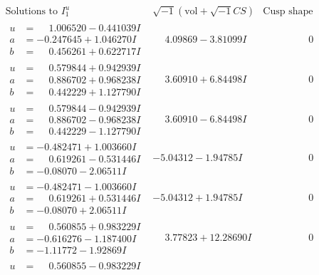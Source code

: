 \documentclass[1p]{elsarticle_modified}
\theoremstyle{definition}
\newcommand{\I}{\sqrt{-1}}
\begin{document}
$$\begin{array}{c|c|c}
\text{Solutions to }I^u_{1}& \I (\text{vol} + \sqrt{-1}CS) & \text{Cusp shape}\\
 \hline 
\begin{aligned}
u &= \phantom{-}1.006520 - 0.441039 I \\
a &= -0.247645 + 1.046270 I \\
b &= \phantom{-}0.456261 + 0.622717 I\end{aligned}
 & \phantom{-}4.09869 - 3.81099 I & \phantom{-0.000000 } 0 \\ \hline\begin{aligned}
u &= \phantom{-}0.579844 + 0.942939 I \\
a &= \phantom{-}0.886702 + 0.968238 I \\
b &= \phantom{-}0.442229 + 1.127790 I\end{aligned}
 & \phantom{-}3.60910 + 6.84498 I & \phantom{-0.000000 } 0 \\ \hline\begin{aligned}
u &= \phantom{-}0.579844 - 0.942939 I \\
a &= \phantom{-}0.886702 - 0.968238 I \\
b &= \phantom{-}0.442229 - 1.127790 I\end{aligned}
 & \phantom{-}3.60910 - 6.84498 I & \phantom{-0.000000 } 0 \\ \hline\begin{aligned}
u &= -0.482471 + 1.003660 I \\
a &= \phantom{-}0.619261 - 0.531446 I \\
b &= -0.08070 - 2.06511 I\end{aligned}
 & -5.04312 - 1.94785 I & \phantom{-0.000000 } 0 \\ \hline\begin{aligned}
u &= -0.482471 - 1.003660 I \\
a &= \phantom{-}0.619261 + 0.531446 I \\
b &= -0.08070 + 2.06511 I\end{aligned}
 & -5.04312 + 1.94785 I & \phantom{-0.000000 } 0 \\ \hline\begin{aligned}
u &= \phantom{-}0.560855 + 0.983229 I \\
a &= -0.616276 - 1.187400 I \\
b &= -1.11772 - 1.92869 I\end{aligned}
 & \phantom{-}3.77823 + 12.28690 I & \phantom{-0.000000 } 0 \\ \hline\begin{aligned}
u &= \phantom{-}0.560855 - 0.983229 I \\

\end{aligned}
\end{array}$$
\end{document}
